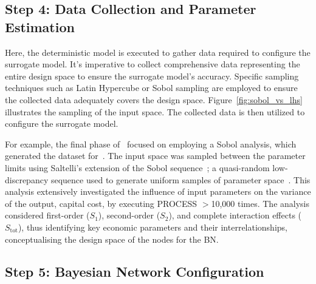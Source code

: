 \documentclass[journal]{IEEEtran}
\begin{document}
\subsection{\textbf{Step 4}: Data Collection and Parameter Estimation}\label{sec:data} 

Here, the deterministic model is executed to gather data required to configure the surrogate model. It's imperative to collect comprehensive data representing the entire design space to ensure the surrogate model's accuracy. Specific sampling techniques such as Latin Hypercube or Sobol sampling are employed to ensure the collected data adequately covers the design space. Figure~\ref{fig:sobol_vs_lhs} illustrates the sampling of the input space. The collected data is then utilized to configure the surrogate model. 

For example, the final phase of~\cite{Hidalgo-Salaverri2023} focused on employing a Sobol analysis, which generated the dataset for~\cite{Griffiths2024}. The input space was sampled between the parameter limits using Saltelli's extension of the Sobol sequence~\cite{Sobol2001, Saltelli2002}; a quasi-random low-discrepancy sequence used to generate uniform samples of parameter space~\cite{Herman2023}. This analysis extensively investigated the influence of input parameters on the variance of the output, capital cost, by executing PROCESS $>$10,000 times. The analysis considered first-order ($S_{1}$), second-order ($S_{2}$), and complete interaction effects ($S_{\text{tot}}$), thus identifying key economic parameters and their interrelationships, conceptualising the design space of the nodes for the BN.\@

\subsection{\textbf{Step 5}: Bayesian Network Configuration}\label{sec:BNconfiguration}
\end{document}
